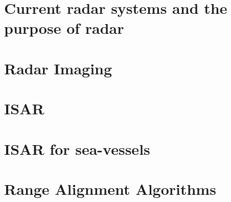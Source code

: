 \documentclass[class=report,11pt,crop=false]{standalone}
\begin{document}
\section{Current radar systems and the purpose of radar}


\section{Radar Imaging}

\section{ISAR}

\section{ISAR for sea-vessels}


\section{Range Alignment Algorithms}
\end{document}
